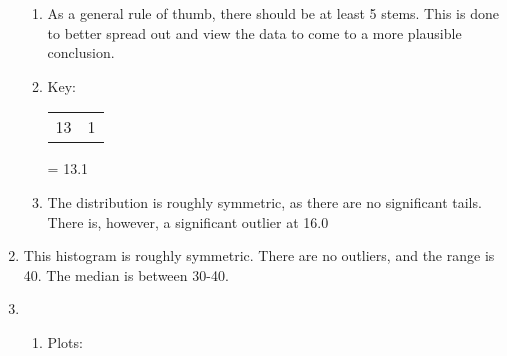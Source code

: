 \documentclass[12pt]{article}
\begin{document}
\begin{enumerate}
    \begin{enumerate}

      \item As a general rule of thumb, there should be at least 5 stems. This is done to better spread out and view the data to come to a more plausible conclusion.

      \item Key: \begin{tabular}{r | l} 13 & 1  \end{tabular} = 13.1

      \item The distribution is roughly symmetric, as there are no significant tails. There is, however, a significant outlier at 16.0

    \end{enumerate}

    \setcounter{enumi}{68}

  \item This histogram is roughly symmetric. There are no outliers, and the range is 40. The median is between 30-40.

    \begin{center}
    \end{center}

    \setcounter{enumi}{78}

\newpage

  \item 

    \begin{enumerate}

      \item Plots:

        \begin{multicols}{2}


\end{multicols}
\end{enumerate}
\end{enumerate}
\end{document}
